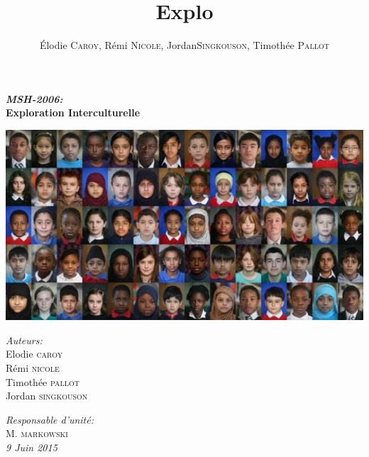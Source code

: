 \documentclass[12pt]{book}
\title{Explo}
\author{\'Elodie \textsc{Caroy}, Rémi \textsc{Nicole}, Jordan\textsc{Singkouson}, Timothée \textsc{Pallot}}
\date{}
\begin{document}
\begin{titlepage}
	\begin{sffamily}
	\begin{center}

	\vspace*{5cm}
	{\huge \bfseries \emph{MSH-2006:}\\
	Exploration Interculturelle \\[0.4cm]}
	\vspace{\fill}
	
	\includegraphics[scale=0.8]{races-620x330.jpg}
	\newline
	
    \begin{minipage}{0.4\textwidth}
      \begin{flushleft} \large
				\emph{Auteurs:}\\
        Elodie \textsc{caroy}\\
				Rémi \textsc{nicole}\\
				Timothée \textsc{pallot}\\
				Jordan \textsc{singkouson}
      \end{flushleft}
    \end{minipage}
    \begin{minipage}{0.4\textwidth}
      \begin{flushright} \large
        \emph{Responsable d'unité:}\\
				M. \textsc{markowski}\\
				
				\emph{9 Juin 2015}
      \end{flushright}
    \end{minipage} 
	\end{center}
	\end{sffamily}
\end{titlepage}
	

\tableofcontents









\end{document}
